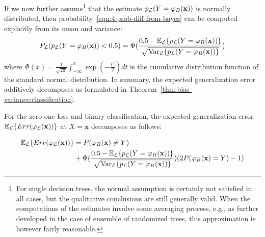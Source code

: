 If we now further assume\footnote{For single decision trees, the normal
assumption is certainly not satisfied in all cases, but the qualitative
conclusions are still generally valid. When the computations of the estimates
involve some averaging process, e.g., as further developed in the case of
ensemble of randomized trees, this approximation is however fairly reasonable.}
that the estimate $p_{\cal L}(Y=\varphi_B(\mathbf{x}))$ is normally distributed,
then probability~\ref{eqn:4:prob-diff-from-bayes} can be computed explicitly
from its mean and variance:
\begin{equation}
P_{\cal L}(p_{\cal L}(Y=\varphi_B(\mathbf{x})) < 0.5) = \Phi(\frac{0.5 - \mathbb{E}_{\cal L}\{ p_{\cal L}(Y=\varphi_B(\mathbf{x})) \}}{\sqrt{\text{Var}_{\cal L}\{ p_{\cal L}(Y=\varphi_B(\mathbf{x})) \}}})
\end{equation}
where $\Phi(x)=\frac{1}{\sqrt{2\pi}} \int_{-\infty}^x \exp(-\frac{t^2}{2}) dt$
is the cumulative distribution function of the standard normal distribution.
In summary, the expected generalization error additively
decomposes as formulated in Theorem~\ref{thm:bias-variance:classification}.

\begin{theorem}\label{thm:bias-variance:classification}
For the zero-one loss and binary classification, the expected
generalization error $\mathbb{E}_{\cal L} \{ Err(\varphi_{\cal L}(\mathbf{x}))
\}$ at $X=\mathbf{x}$ decomposes as follows:

\begin{align}
\mathbb{E}_{\cal L} \{ Err(\varphi_{\cal L}(\mathbf{x})) \} &= P(\varphi_B(\mathbf{x})\neq Y) \\
                                                            &+ \Phi(\frac{0.5 - \mathbb{E}_{\cal L}\{ p_{\cal L}(Y=\varphi_B(\mathbf{x})) \}}{\sqrt{\text{Var}_{\cal L}\{ p_{\cal L}(Y=\varphi_B(\mathbf{x})) \}}}) (2 P(\varphi_B(\mathbf{x}) = Y) - 1) \nonumber
\end{align}
\end{theorem}

